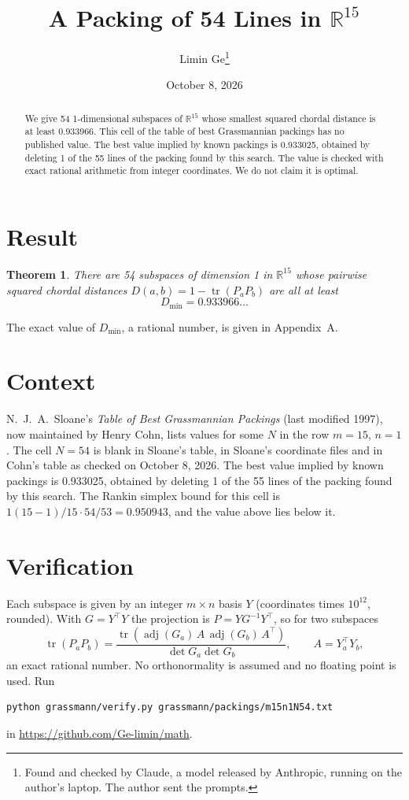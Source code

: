 \documentclass[11pt,a4paper]{article}
\title{A Packing of 54 Lines in $\mathbb{R}^{15}$}
\author{Limin Ge\thanks{Found and checked by Claude, a model released by Anthropic, running on the author's laptop. The author sent the prompts.}}
\date{October 8, 2026}
\newtheorem*{theorem}{Theorem}
\begin{document}
\maketitle
\begin{abstract}
We give 54 1-dimensional subspaces of $\mathbb{R}^{15}$ whose smallest squared chordal distance is at least 0.933966. This cell of the table of best Grassmannian packings has no published value. The best value implied by known packings is 0.933025, obtained by deleting 1 of the 55 lines of the packing found by this search. The value is checked with exact rational arithmetic from integer coordinates. We do not claim it is optimal.
\end{abstract}

\section{Result}
\begin{theorem}
There are 54 subspaces of dimension 1 in $\mathbb{R}^{15}$ whose pairwise squared chordal distances $D(a,b) = 1 - \operatorname{tr}(P_aP_b)$ are all at least
\[ D_{\min} = 0.933966\ldots \]
\end{theorem}
The exact value of $D_{\min}$, a rational number, is given in Appendix~A.


\section{Context}
N.~J.~A.~Sloane's \emph{Table of Best Grassmannian Packings} (last modified 1997), now maintained by Henry Cohn, lists values for some $N$ in the row $m=15$, $n=1$. The cell $N=54$ is blank in Sloane's table, in Sloane's coordinate files and in Cohn's table as checked on October 8, 2026. The best value implied by known packings is 0.933025, obtained by deleting 1 of the 55 lines of the packing found by this search. The Rankin simplex bound for this cell is $1(15-1)/15\cdot 54/53 = 0.950943$, and the value above lies below it.


\section{Verification}
Each subspace is given by an integer $m\times n$ basis $Y$ (coordinates times $10^{12}$, rounded). With $G=Y^\top Y$ the projection is $P=YG^{-1}Y^\top$, so for two subspaces
\[ \operatorname{tr}(P_aP_b)=\frac{\operatorname{tr}(\operatorname{adj}(G_a)\,A\,\operatorname{adj}(G_b)\,A^\top)}{\det G_a\det G_b},\qquad A=Y_a^\top Y_b, \]
an exact rational number. No orthonormality is assumed and no floating point is used. Run
\begin{verbatim}
python grassmann/verify.py grassmann/packings/m15n1N54.txt
\end{verbatim}
in \url{https://github.com/Ge-limin/math}.
\end{document}
